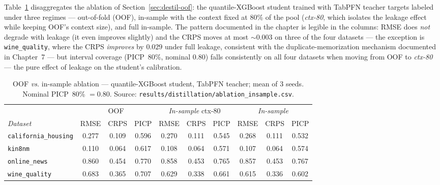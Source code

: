 Table~\ref{tab:app-abl-oof} disaggregates the ablation of
Section~\ref{sec:destil-oof}: the quantile-XGBoost student trained
with TabPFN teacher targets labeled under three regimes ---
out-of-fold (OOF), in-sample with the context fixed at 80\% of the
pool (\emph{ctx-80}, which isolates the leakage effect while keeping
OOF's context size), and full in-sample. The pattern documented in
the chapter is legible in the columns: RMSE does \emph{not} degrade
with leakage (it even improves slightly) and the CRPS moves at most
${\sim}0.003$ on three of the four datasets --- the exception is
\texttt{wine\_quality}, where the CRPS \emph{improves} by $0.029$
under full leakage, consistent with the duplicate-memorization
mechanism documented in Chapter~7 --- but interval coverage
(PICP~80\%, nominal $0.80$) falls consistently on all four datasets
when moving from OOF to \emph{ctx-80} --- the pure effect of leakage
on the student's calibration.

\begin{table}[htbp]
\centering\small
\caption[OOF \emph{vs.} in-sample ablation --- disaggregated]{OOF
\emph{vs.} in-sample ablation --- quantile-XGBoost student, TabPFN
teacher; mean of 3 seeds. Nominal PICP~80\% $= 0.80$. Source:
\texttt{results/\allowbreak distillation/\allowbreak ablation\_\allowbreak insample.\allowbreak csv}.}
\label{tab:app-abl-oof}
\setlength{\tabcolsep}{4.5pt}
\begin{tabular}{lccccccccc}
\toprule
 & \multicolumn{3}{c}{OOF} & \multicolumn{3}{c}{\emph{In-sample}
 ctx-80} & \multicolumn{3}{c}{\emph{In-sample}} \\
\cmidrule(lr){2-4}\cmidrule(lr){5-7}\cmidrule(lr){8-10}
\emph{Dataset} & RMSE & CRPS & PICP & RMSE & CRPS & PICP
               & RMSE & CRPS & PICP \\
\midrule
\texttt{california\_\allowbreak housing} & 0.277 & 0.109 & 0.596
  & 0.270 & 0.111 & 0.545 & 0.268 & 0.111 & 0.532 \\
\texttt{kin8nm}              & 0.110 & 0.064 & 0.617
  & 0.108 & 0.064 & 0.571 & 0.107 & 0.064 & 0.574 \\
\texttt{online\_news}         & 0.860 & 0.454 & 0.770
  & 0.858 & 0.453 & 0.765 & 0.857 & 0.453 & 0.767 \\
\texttt{wine\_quality}       & 0.683 & 0.365 & 0.707
  & 0.629 & 0.338 & 0.661 & 0.615 & 0.336 & 0.602 \\
\bottomrule
\end{tabular}
\end{table}

